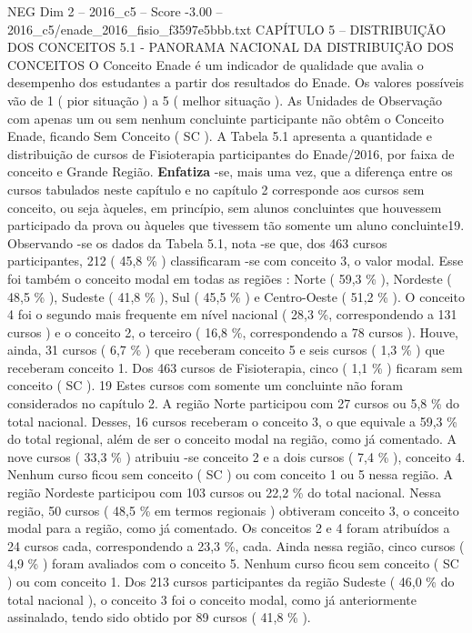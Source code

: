 \begin{textsample}{NEG Dim 2 – 2016\_c5 – Score -3.00 – 2016\_c5/enade\_2016\_fisio\_f3597e5bbb.txt}  \label{ex:f2_neg_035}
CAPÍTULO 5 – DISTRIBUIÇÃO DOS CONCEITOS 5.1 - PANORAMA NACIONAL DA DISTRIBUIÇÃO DOS CONCEITOS O Conceito Enade é um indicador de qualidade que avalia o desempenho dos estudantes a partir dos resultados do Enade.
Os valores possíveis vão de 1 ( pior situação ) a 5 ( melhor situação ).
As Unidades de Observação com apenas um ou sem nenhum concluinte participante não obtêm o Conceito Enade, ficando Sem Conceito ( SC ).
A Tabela 5.1 apresenta a quantidade e distribuição de cursos de Fisioterapia participantes do Enade/2016, por faixa de conceito e Grande Região. \textbf{Enfatiza} -se, mais uma vez, que a diferença entre os cursos tabulados neste capítulo e no capítulo 2 corresponde aos cursos sem conceito, ou seja àqueles, em princípio, sem alunos concluintes que houvessem participado da prova ou àqueles que tivessem tão somente um aluno concluinte19.
Observando -se os dados da Tabela 5.1, nota -se que, dos 463 cursos participantes, 212 ( 45,8 \% ) classificaram -se com conceito 3, o valor modal.
Esse foi também o conceito modal em todas as regiões : Norte ( 59,3 \% ), Nordeste ( 48,5 \% ), Sudeste ( 41,8 \% ), Sul ( 45,5 \% ) e Centro-Oeste ( 51,2 \% ).
O conceito 4 foi o segundo mais frequente em nível nacional ( 28,3 \%, correspondendo a 131 cursos ) e o conceito 2, o terceiro ( 16,8 \%, correspondendo a 78 cursos ).
Houve, ainda, 31 cursos ( 6,7 \% ) que receberam conceito 5 e seis cursos ( 1,3 \% ) que receberam conceito 1.
Dos 463 cursos de Fisioterapia, cinco ( 1,1 \% ) ficaram sem conceito ( SC ). 19 Estes cursos com somente um concluinte não foram considerados no capítulo 2.
A região Norte participou com 27 cursos ou 5,8 \% do total nacional.
Desses, 16 cursos receberam o conceito 3, o que equivale a 59,3 \% do total regional, além de ser o conceito modal na região, como já comentado.
A nove cursos ( 33,3 \% ) atribuiu -se conceito 2 e a dois cursos ( 7,4 \% ), conceito 4.
Nenhum curso ficou sem conceito ( SC ) ou com conceito 1 ou 5 nessa região.
A região Nordeste participou com 103 cursos ou 22,2 \% do total nacional.
Nessa região, 50 cursos ( 48,5 \% em termos regionais ) obtiveram conceito 3, o conceito modal para a região, como já comentado.
Os conceitos 2 e 4 foram atribuídos a 24 cursos cada, correspondendo a 23,3 \%, cada.
Ainda nessa região, cinco cursos ( 4,9 \% ) foram avaliados com o conceito 5.
Nenhum curso ficou sem conceito ( SC ) ou com conceito 1.
Dos 213 cursos participantes da região Sudeste ( 46,0 \% do total nacional ), o conceito 3 foi o conceito modal, como já anteriormente assinalado, tendo sido obtido por 89 cursos ( 41,8 \% ).

\end{textsample}
